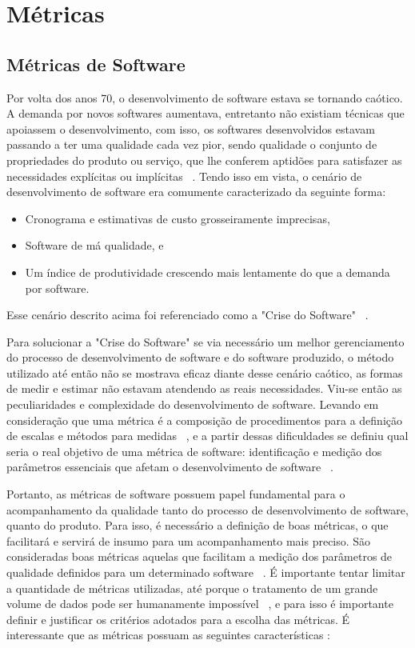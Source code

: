 \chapter{Métricas}

\section{Métricas de Software}

Por volta dos anos 70, o desenvolvimento de software estava se tornando caótico. A demanda por novos softwares aumentava,
entretanto não existiam técnicas que apoiassem o desenvolvimento, com isso, os softwares desenvolvidos estavam passando
a ter uma qualidade cada vez pior, sendo qualidade o conjunto de propriedades do produto ou serviço, que lhe conferem 
aptidões para satisfazer as necessidades explícitas ou implícitas ~\cite{iso:8402}. Tendo isso em vista, o cenário de
desenvolvimento de software era comumente caracterizado da seguinte forma:

\begin{itemize}
  \item Cronograma e estimativas de custo grosseiramente imprecisas,
  \item Software de má qualidade, e
  \item Um índice de produtividade crescendo mais lentamente do que a demanda por software.
\end{itemize}

Esse cenário descrito acima foi referenciado como a "Crise do Software" ~\cite{arthur85}.

Para solucionar a "Crise do Software"  se via necessário um melhor gerenciamento do processo de desenvolvimento de software
e do software produzido, o método utilizado até então não se mostrava eficaz diante desse cenário caótico, as formas de medir 
e estimar não estavam atendendo as reais necessidades. Viu-se então as peculiaridades e complexidade do desenvolvimento de 
software. Levando em consideração que uma métrica é a composição de procedimentos para a definição de escalas e métodos para 
medidas ~\cite{iso:9126-1}, e a partir dessas dificuldades se definiu qual seria o real objetivo de uma métrica de software: 
identificação e medição dos parâmetros essenciais que afetam o desenvolvimento de software ~\cite{mills88}.

Portanto, as métricas de software possuem papel fundamental para o acompanhamento da qualidade tanto do processo de
desenvolvimento de software, quanto do produto. Para isso, é necessário a definição de boas métricas, o que facilitará
e servirá de insumo para um acompanhamento mais preciso. São consideradas boas métricas aquelas que facilitam a medição dos 
parâmetros de qualidade definidos para um determinado software ~\cite{mills88}. É importante tentar limitar a quantidade
de métricas utilizadas, até porque o tratamento de um grande volume de dados pode ser humanamente impossível 
~\cite{meirelles2013}, e para isso é importante definir e justificar os critérios adotados para a escolha das métricas.
É interessante que as métricas possuam as seguintes características \cite{fenton&pfleenger98,mills88}:

